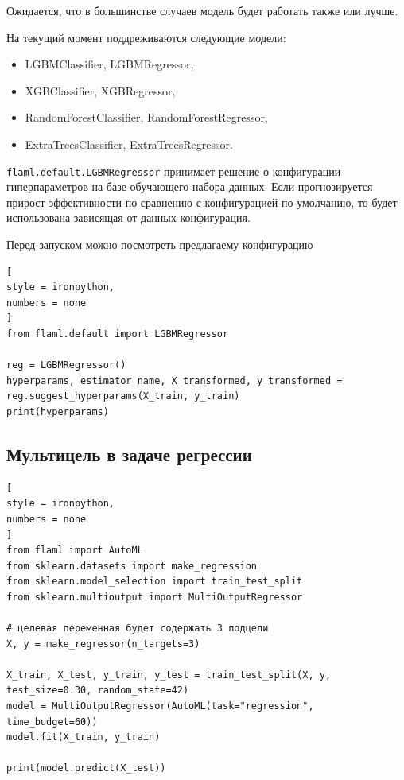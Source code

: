 \documentclass[%
	11pt,
	a4paper,
	utf8,
		]{article}
\begin{document}
Ожидается, что в большинстве случаев модель будет работать также или лучше.

На текущий момент поддреживаются следующие модели:
\begin{itemize}
	\item LGBMClassifier, LGBMRegressor,
	
	\item XGBClassifier, XGBRegressor,
	
	\item RandomForestClassifier, RandomForestRegressor,
	
	\item ExtraTreesClassifier, ExtraTreesRegressor.
\end{itemize}

\verb|flaml.default.LGBMRegressor| принимает решение о конфигурации гиперпараметров на базе обучающего набора данных. Если прогнозируется прирост эффективности по сравнению с конфигурацией по умолчанию, то будет использована зависящая от данных конфигурация.

Перед запуском можно посмотреть  предлагаему конфигурацию
\begin{lstlisting}[
style = ironpython,
numbers = none
]
from flaml.default import LGBMRegressor

reg = LGBMRegressor()
hyperparams, estimator_name, X_transformed, y_transformed = reg.suggest_hyperparams(X_train, y_train)
print(hyperparams)
\end{lstlisting}

\subsection{Мультицель в задаче регрессии}

\begin{lstlisting}[
style = ironpython,
numbers = none
]
from flaml import AutoML
from sklearn.datasets import make_regression
from sklearn.model_selection import train_test_split
from sklearn.multioutput import MultiOutputRegressor

# целевая переменная будет содержать 3 подцели
X, y = make_regressor(n_targets=3)

X_train, X_test, y_train, y_test = train_test_split(X, y, test_size=0.30, random_state=42)
model = MultiOutputRegressor(AutoML(task="regression", time_budget=60))
model.fit(X_train, y_train)

print(model.predict(X_test))
\end{lstlisting}
\end{document}
